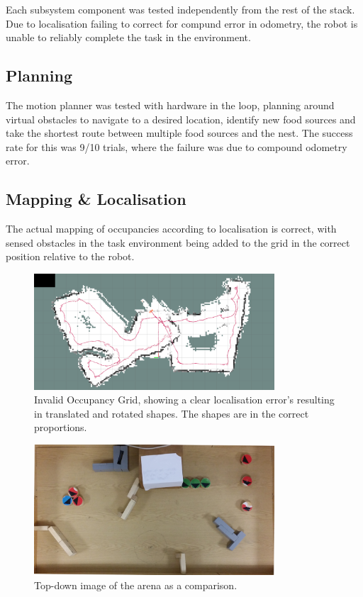 \documentclass[11pt, a4paper]{article}
\begin{document}
Each subsystem component was tested independently from the rest of the stack. Due to
localisation failing to correct for compund error in odometry, the robot is unable
to reliably complete the task in the environment.

\subsection{Planning}

The motion planner was tested with hardware in the loop, planning around virtual obstacles
to navigate to a desired location, identify new food sources and take the shortest route between 
multiple food sources and the nest. The success rate for this was 9/10 trials, where
the failure was due to compound odometry error.

\subsection{Mapping \& Localisation}

The actual mapping of occupancies according to localisation is correct, with sensed obstacles
in the task environment being added to the grid in the correct position relative to the robot.

\begin{figure}[H]
	  \centering
	  \includegraphics[width=0.8\textwidth]{../assets/SLAM/failtrial1.png}
          \caption{
            \label{fig:ogrotate}
            Invalid Occupancy Grid, showing a clear localisation error's resulting
            in translated and rotated shapes. The shapes are in the correct proportions.
          }
\end{figure}

\begin{figure}[H]
	  \centering
	  \includegraphics[width=0.8\textwidth]{../assets/arena.jpg}
          \caption{
            Top-down image of the arena as a comparison.
          }
\end{figure}
\end{document}
